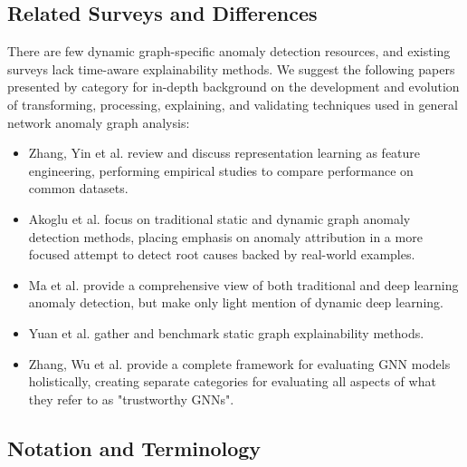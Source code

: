 \subsection{Related Surveys and Differences}
There are few dynamic graph-specific anomaly detection resources, and existing surveys lack time-aware explainability methods. We suggest the following papers presented by category for in-depth background on the development and evolution of transforming, processing, explaining, and validating techniques used in general network anomaly graph analysis:

\begin{itemize}
    \item Zhang, Yin et al.\cite{zhang_network_2020} review and discuss representation learning as feature engineering, performing empirical studies to compare performance on common datasets.
    \item Akoglu et al.\cite{akoglu_graph_2015} focus on traditional static and dynamic graph anomaly detection methods, placing emphasis on anomaly attribution in a more focused attempt to detect root causes backed by real-world examples.
    \item Ma et al.\cite{ma_comprehensive_2021} provide a comprehensive view of both traditional and deep learning anomaly detection, but make only light mention of dynamic deep learning.
    \item Yuan et al.\cite{yuan_explainability_2023} gather and benchmark static graph explainability methods.
    \item Zhang, Wu et al.\cite{zhang_trustworthy_2022} provide a complete framework for evaluating GNN models holistically, creating separate categories for evaluating all aspects of what they refer to as "trustworthy GNNs".
\end{itemize}

\subsection{Notation and Terminology}
